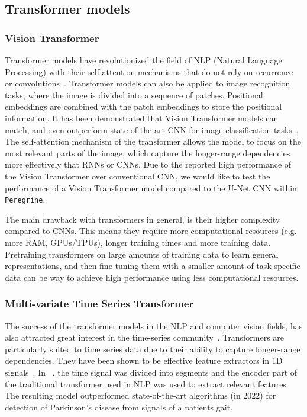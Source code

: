 
\subsection{Transformer models}

\subsubsection{Vision Transformer}

Transformer models have revolutionized the field of NLP (Natural Language Processing) with their self-attention mechanisms that do not rely on recurrence or convolutions~\cite{Vaswani_2017_transformer}. Transformer models can also be applied to image recognition tasks, where the image is divided into a sequence of patches. Positional embeddings are combined with the patch embeddings to store the positional information. It has been demonstrated that Vision Transformer models can match, and even outperform state-of-the-art CNN for image classification tasks~\cite{Dosovitskiy_2021_ViT}. The self-attention mechanism of the transformer allows the model to focus on the most relevant parts of the image, which capture the longer-range dependencies more effectively that RNNs or CNNs. Due to the reported high performance of the Vision Transformer over conventional CNN, we would like to test the performance of a Vision Transformer model compared to the U-Net CNN within \texttt{Peregrine}.

The main drawback with transformers in general, is their higher complexity compared to CNNs. This means they require more computational resources (e.g. more RAM, GPUs/TPUs), longer training times and more training data. Pretraining transformers on large amounts of training data to learn general representations, and then fine-tuning them with a smaller amount of task-specific data can be way to achieve high performance using less computational resources.

\subsubsection{Multi-variate Time Series Transformer}

The success of the transformer models in the NLP and computer vision fields, has also attracted great interest in the time-series community~\cite{Wen_Zhou_Zhang_Chen_Ma_Yan_Sun_2023}. Transformers are particularly suited to time series data due to their ability to capture longer-range dependencies. They have been shown to be effective feature extractors in 1D signals~\cite{Nguyen_Miah_Bilodeau_Bouachir_2022}. In ~\cite{Nguyen_Miah_Bilodeau_Bouachir_2022}, the time signal was divided into segments and the encoder part of the traditional transformer used in NLP was used to extract relevant features. The resulting model outperformed state-of-the-art algorithms (in 2022) for detection of Parkinson's disease from signals of a patients gait. 

